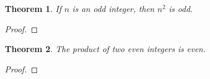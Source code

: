 \documentclass[]{exam}
\newtheorem*{theorem}{Theorem}
\begin{document}
  \begin{center}
  \end{center}

  \begin{questions}
    \question
      \begin{theorem}
        If $n$ is an odd integer, then $n^2$ is odd.
      \end{theorem}

      \begin{proof}
        \mbox{}\par
        \vspace{1in}
      \end{proof}

    \question
      \begin{theorem}
        The product of two even integers is even.
      \end{theorem}

      \begin{proof}
        \mbox{}\par
        \vspace{1in}
      \end{proof}
  \end{questions}
\end{document}
